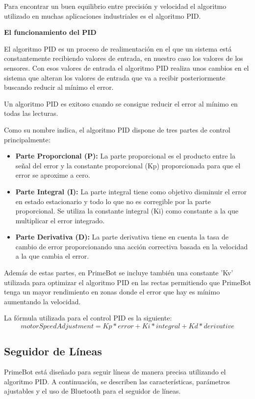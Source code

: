 Para encontrar un buen equilibrio entre precisión y velocidad el algoritmo utilizado en muchas aplicaciones industriales es el algoritmo PID. ~\cite{ogata2010}

\textbf{El funcionamiento del PID}

El algoritmo PID es un proceso de realimentación en el que un sistema está constantemente recibiendo valores de entrada, en nuestro caso los valores de los sensores.
Con esos valores de entrada el algoritmo PID realiza unos cambios en el sistema que alteran los valores de entrada que va a recibir posteriormente buscando reducir al mínimo el error.

Un algoritmo PID es exitoso cuando se consigue reducir el error al mínimo en todas las lecturas.

Como su nombre indica, el algoritmo PID dispone de tres partes de control principalmente:

\begin{itemize}
	\item \textbf{Parte Proporcional (P):} La parte proporcional es el producto entre la señal del error y la constante proporcional (Kp) proporcionada para que el error se aproxime a cero.
	\item \textbf{Parte Integral (I):} La parte integral tiene como objetivo disminuir el error en estado estacionario y todo lo que no es corregible por la parte proporcional. Se utiliza la constante integral (Ki) como constante a la que multiplicar el error integrado.
	\item \textbf{Parte Derivativa (D):} La parte derivativa tiene en cuenta la tasa de cambio de error proporcionando una acción correctiva basada en la velocidad a la que cambia el error.
\end{itemize}

Además de estas partes, en PrimeBot se incluye también una constante 'Kv' utilizada para optimizar el algoritmo PID en las rectas permitiendo que PrimeBot tenga un mayor rendimiento en zonas donde el error que hay es mínimo aumentando la velocidad.

La fórmula utilizada para el control PID es la siguiente:
\begin{equation*}
	motorSpeedAdjustment = Kp * error + Ki * integral + Kd * derivative
\end{equation*}

\subsection{Seguidor de Líneas}\label{seguidor-lineas}
PrimeBot está diseñado para seguir líneas de manera precisa utilizando el algoritmo PID. 
A continuación, se describen las características, parámetros ajustables y el uso de Bluetooth para el seguidor de líneas.
